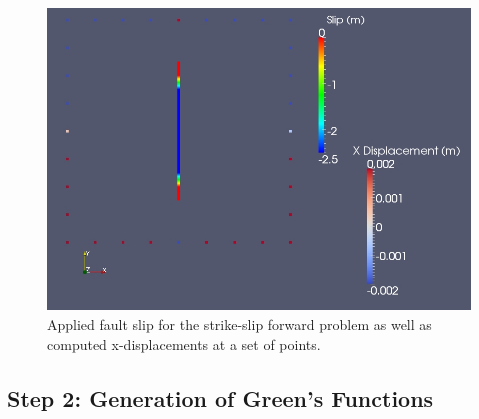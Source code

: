 \begin{figure}
  \includegraphics[scale=0.33]{examples/figs/greensfns2d_strikeslip_forward_points}
  \caption{Applied fault slip for the strike-slip forward problem as well as
    computed x-displacements at a set of points.}
  \label{fig:greensfns2d-strikeslip-forward}
\end{figure}


\subsection{Step 2: Generation of Green's Functions}

